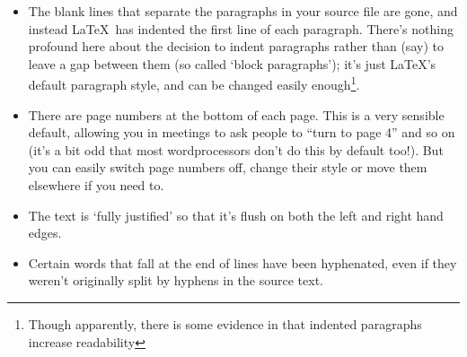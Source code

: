 \begin{refsection}
\begin{itemize}
\item The blank lines that separate the paragraphs in your source file are gone, and instead \LaTeX\ has indented the first line of each paragraph. There's nothing profound here about the decision to indent paragraphs rather than (say) to leave a gap between them (so called `block paragraphs'); it's just \LaTeX's default paragraph style, and can be changed easily enough\footnote{Though apparently, there is some evidence in \cite{tinker63} that indented paragraphs increase readability}.
\item There are page numbers at the bottom of each page. This is a very sensible default, allowing you in meetings to ask people to ``turn to page 4'' and so on (it's a bit odd that most wordprocessors don't do this by default too!). But you can easily switch page numbers off, change their style or move them elsewhere if you need to. 
\item The text is `fully justified' so that it's flush on both the left and right hand edges.
\item Certain words that fall at the end of lines have been hyphenated, even if they weren't originally split by hyphens in the source text.
\end{itemize}


\end{refsection}
